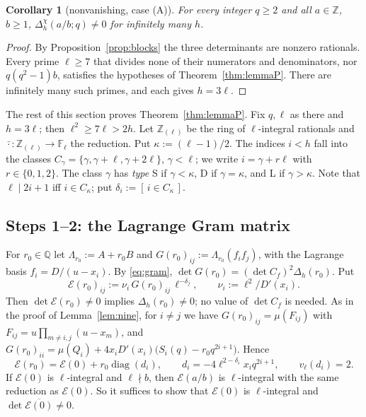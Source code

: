 \documentclass[11pt]{amsart}
\newtheorem{corollary}[theorem]{Corollary}
\theoremstyle{definition}
\theoremstyle{remark}
\numberwithin{equation}{section}
\newcommand{\ZZ}{\mathbb{Z}}
\newcommand{\QQ}{\mathbb{Q}}
\newcommand{\FF}{\mathbb{F}}
\newcommand{\ind}[1]{[\,#1\,]}
\begin{document}
\begin{corollary}[nonvanishing, case (A)]\label{cor:nonvanA}
For every integer $q\ge2$ and all $a\in\ZZ$, $b\ge1$, $\Delta^\chi_h(a/b;q)\ne0$ for infinitely many $h$.
\end{corollary}

\begin{proof}
By Proposition~\ref{prop:blocks} the three determinants are nonzero rationals. Every prime $\ell\ge7$ that divides none
of their numerators and denominators, nor $q(q^2-1)b$, satisfies the hypotheses of Theorem~\ref{thm:lemmaP}. There are
infinitely many such primes, and each gives $h=3\ell$.
\end{proof}

The rest of this section proves Theorem~\ref{thm:lemmaP}. Fix $q,\ell$ as there and $h=3\ell$; then $\ell^2\ge7\ell>2h$.
Let $\ZZ_{(\ell)}$ be the ring of $\ell$-integral rationals and $\bar{\cdot}\colon\ZZ_{(\ell)}\to\FF_\ell$ the reduction. Put
$\kappa:=(\ell-1)/2$. The indices $i<h$ fall into the classes $C_\gamma=\{\gamma,\gamma+\ell,\gamma+2\ell\}$, $\gamma<\ell$;
we write $i=\gamma+r\ell$ with $r\in\{0,1,2\}$. The class $\gamma$ has \emph{type} S if $\gamma<\kappa$, D if $\gamma=\kappa$, and L if
$\gamma>\kappa$. Note that $\ell\mid2i+1$ iff $i\in C_\kappa$; put $\delta_i:=\ind{i\in C_\kappa}$.

\subsection{Steps 1--2: the Lagrange Gram matrix}
For $r_0\in\QQ$ let $\Lambda_{r_0}:=A+r_0B$ and $G(r_0)_{ij}:=\Lambda_{r_0}(f_if_j)$, with the Lagrange basis $f_i=D/(u-x_i)$. By
\eqref{eq:gram}, $\det G(r_0)=(\det C_f)^2\Delta_h(r_0)$. Put
\[
  \mathcal E(r_0)_{ij}:=\nu_i\,G(r_0)_{ij}\,\ell^{-\delta_j},\qquad \nu_i:=\ell^2/D'(x_i).
\]
Then $\det\mathcal E(r_0)\ne0$ implies $\Delta_h(r_0)\ne0$; no value of $\det C_f$ is needed. As in the proof of
Lemma~\ref{lem:nine}, for $i\ne j$ we have $G(r_0)_{ij}=\mu(F_{ij})$ with $F_{ij}=u\prod_{m\ne i,j}(u-x_m)$, and
$G(r_0)_{ii}=\mu(Q_i)+4x_iD'(x_i)\bigl(S_i(q)-r_0q^{2i+1}\bigr)$. Hence
\[
  \mathcal E(r_0)=\mathcal E(0)+r_0\operatorname{diag}(d_i),\qquad d_i=-4\ell^{2-\delta_i}x_iq^{2i+1},\qquad v_\ell(d_i)=2 .
\]
If $\mathcal E(0)$ is $\ell$-integral and $\ell\nmid b$, then $\mathcal E(a/b)$ is $\ell$-integral with the same reduction as $\mathcal E(0)$.
So it suffices to show that $\mathcal E(0)$ is $\ell$-integral and $\det\overline{\mathcal E(0)}\ne0$.
\end{document}
